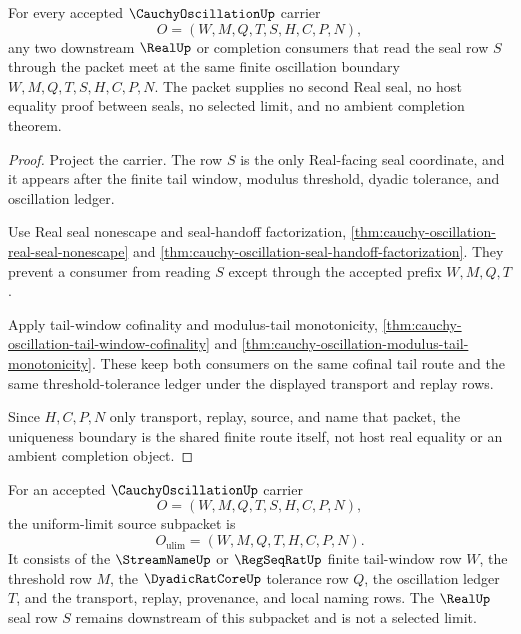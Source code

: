 \begin{theorem}
\label{thm:cauchy-oscillation-real-seal-uniqueness-boundary}
For every accepted $\CauchyOscillationUp$ carrier
$$
O=(W,M,Q,T,S,H,C,P,N),
$$
any two downstream $\RealUp$ or completion consumers that read the seal row $S$ through the packet meet at the same finite oscillation boundary $W,M,Q,T,S,H,C,P,N$. The packet supplies no second Real seal, no host equality proof between seals, no selected limit, and no ambient completion theorem.
\end{theorem}
\begin{proof}
Project the carrier. The row $S$ is the only Real-facing seal coordinate, and it appears after the finite tail window, modulus threshold, dyadic tolerance, and oscillation ledger.

Use Real seal nonescape and seal-handoff factorization, \autoref{thm:cauchy-oscillation-real-seal-nonescape} and \autoref{thm:cauchy-oscillation-seal-handoff-factorization}. They prevent a consumer from reading $S$ except through the accepted prefix $W,M,Q,T$.

Apply tail-window cofinality and modulus-tail monotonicity, \autoref{thm:cauchy-oscillation-tail-window-cofinality} and \autoref{thm:cauchy-oscillation-modulus-tail-monotonicity}. These keep both consumers on the same cofinal tail route and the same threshold-tolerance ledger under the displayed transport and replay rows.

Since $H,C,P,N$ only transport, replay, source, and name that packet, the uniqueness boundary is the shared finite route itself, not host real equality or an ambient completion object.
\end{proof}

\begin{definition}
\label{def:cauchy-oscillation-uniform-limit-source}
For an accepted $\CauchyOscillationUp$ carrier
$$
O=(W,M,Q,T,S,H,C,P,N),
$$
the uniform-limit source subpacket is
$$
O_{\mathrm{ulim}}=(W,M,Q,T,H,C,P,N).
$$
It consists of the $\StreamNameUp$ or $\RegSeqRatUp$ finite tail-window row $W$, the threshold row $M$, the $\DyadicRatCoreUp$ tolerance row $Q$, the oscillation ledger $T$, and the transport, replay, provenance, and local naming rows. The $\RealUp$ seal row $S$ remains downstream of this subpacket and is not a selected limit.
\end{definition}

